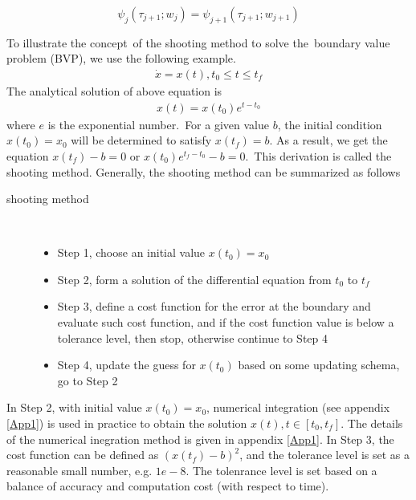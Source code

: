 \begin{equation}
	\psi_j(\tau_{j+1};w_j) =  \psi_{j+1}(\tau_{j+1};w_{j+1})
\end{equation}

To illustrate the concept of the shooting method to solve the boundary value problem (BVP), we use the following example.
\begin{align*}
	\dot{x} = x(t), t_0 \leq t \leq t_f 
\end{align*}
The analytical solution of above equation is 
\begin{align*}
	x(t) = x(t_0)e^{t - t_0}
\end{align*}
where $e$ is the exponential number. For a given value $b$, the initial condition $x(t_0) = x_0$ will be determined to satisfy $x(t_f) = b$. As a result, we get the equation $x(t_f)-b = 0$ or $x(t_0)e^{t_f - t_0}-b = 0$. This derivation is called the shooting method. Generally, the shooting method can be summarized as follows
\begin{description}
	\item[shooting method] \
	\begin{itemize}
		\item Step 1, choose an initial value $x(t_0)=x_0$ 
		\item Step 2, form a solution of the differential equation from $t_0$ to $t_f$
		\item Step 3, define a cost function for the error at the boundary and evaluate such cost function, and if the cost function value is below a tolerance level, then stop, otherwise continue to Step 4 
		\item Step 4, update the guess for $x(t_0)$ based on some updating schema, go to Step 2
	\end{itemize}
\end{description}
In Step 2, with initial value $x(t_0)=x_0$, numerical integration (see appendix \ref{App1}) is used in practice to obtain the solution $x(t), t \in [t_0, t_f]$. The details of the numerical inegration method is given in appendix \ref{App1}. In Step 3, the cost function can be defined as $(x(t_f)-b)^2$, and the tolerance level is set as a reasonable small number, e.g. $1e-8$. The tolenrance level is set based on a balance of accuracy and computation cost (with respect to time). 


